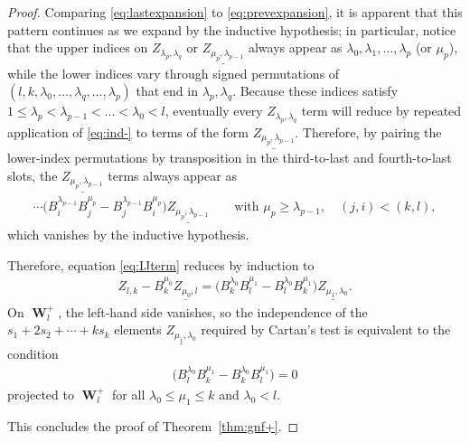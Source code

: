 \documentclass[11pt]{article}
\numberwithin{equation}{section}
\DeclareMathOperator{\Wu}{\mathbf{W}}
\begin{document}
\begin{proof}
Comparing \eqref{eq:lastexpansion} to \eqref{eq:prevexpansion}, it is apparent
that this pattern continues as we expand by the inductive hypothesis;
in particular, notice that the upper indices on $Z_{\lambda_{p}, \lambda_{q}}$
or $\underline{Z_{\mu_{p},\lambda_{p-1}}}$
always appear as $\lambda_0, \lambda_1, \ldots, \lambda_p$ (or $\mu_p$), while the lower indices
vary through signed permutations of $(l,k,\lambda_0, \ldots,
\lambda_q, \ldots, \lambda_p)$ that end in  $\lambda_p,\lambda_q$.
Because these indices satisfy $1 \leq \lambda_p < \lambda_{p-1} < \dots < \lambda_0 < l$, eventually
every $Z_{\lambda_p, \lambda_q}$ term will reduce by repeated application of
\eqref{eq:ind-} to terms of the
form $\underline{Z_{\mu_p,\lambda_{p-1}}}$.  Therefore,
by pairing the lower-index permutations by transposition in the third-to-last
and fourth-to-last slots, the $\underline{Z_{\mu_{p},\lambda_{p-1}}}$ terms always appear as
\begin{gather*}
\cdots
\big(B^{\lambda_{p-1}}_iB^{\mu_{p}}_j
- B^{\lambda_{p-1}}_jB^{\mu_{p}}_i\big)\underline{Z_{\mu_{p},\lambda_{p-1}}} \qquad
\text{with $\mu_{p} \geq \lambda_{p-1},\quad (j,i) < (k,l)$},
\end{gather*} which vanishes by the
inductive hypothesis.

Therefore, equation \eqref{eq:IJterm} reduces by induction to
\begin{gather*}
Z_{l,k}  -B_k^{\mu_0} \underline{Z_{\mu_0,l}} =
\big(B_{k}^{\lambda_0}B_{l}^{\mu_1} - B_{l}^{\lambda_0}B_{k}^{\mu_1}\big)
\underline{Z_{\mu_1,\lambda_0}}.
\end{gather*}
On $\Wu^+_l$, the left-hand side vanishes, so the independence of the
$s_1 + 2s_2 + \cdots + k s_k$ elements
$\underline{Z_{\mu_1,\lambda_0}}$ required by Cartan's test is equivalent to
the condition
\begin{gather*}
\big(B_{l}^{\lambda_0}B_{k}^{\mu_1} - B_{k}^{\lambda_0}B_{l}^{\mu_1}\big)
=0
\end{gather*}
projected to $\Wu^+_l$ for all $\lambda_0 \leq \mu_1  \leq k$ and $\lambda_0 < l$.

This concludes the proof of Theorem~\ref{thm:gnf+}.
\end{proof}
\end{document}
